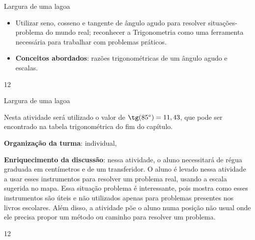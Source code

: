 \clearmargin
\begin{objectives}{Largura de uma lagoa}
{
\begin{itemize}
\item Utilizar seno, cosseno e tangente de ângulo agudo para resolver situações-problema do mundo real; reconhecer a Trigonometria como uma ferramenta necessária para trabalhar com problemas práticos.
\item \textbf{Conceitos abordados}: razões trigonométricas de um ângulo agudo e escalas.
\end{itemize}
}{1}{2}
\end{objectives}
\begin{sugestions}{Largura de uma lagoa}
{
Nesta atividade será utilizado o valor de $\tg (85^\circ)=11,43$, que pode ser encontrado na tabela trigonométrica do fim do capítulo. 

\textbf{Organização da turma}: individual,

\textbf{Enriquecimento da discussão}: nessa atividade, o aluno necessitará de régua graduada em centímetros e de um transferidor. O aluno é levado nessa atividade a usar esses instrumentos para resolver um problema real, usando a escala sugerida no mapa. Essa situação problema é interessante, pois mostra como esses instrumentos são úteis e não utilizados apenas para problemas presentes nos livros escolares. Além disso, a atividade põe o aluno numa posição não usual onde ele precisa propor um método ou caminho para resolver um problema.
}{1}{2}
\end{sugestions}
